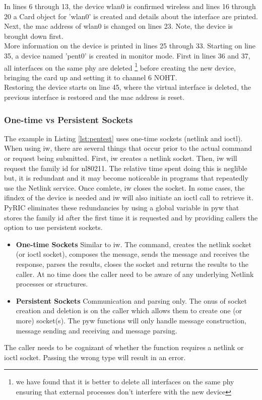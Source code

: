 \documentclass[11pt]{article}
\begin{document}
In lines 6 through 13, the device wlan0 is confirmed wireless and lines 16 through
20 a Card object for 'wlan0' is created and details about the interface are printed. 
Next, the mac address of wlan0 is changed on lines 23. Note, the device is brought
down first. \\

More information on the device is printed in lines 25 through 33. Starting on
line 35, a device named 'pent0' is created in monitor mode. First in lines 36 
and 37, all interfaces on the same phy are deleted \footnote{we have found that
it is better to delete all interfaces on the same phy ensuring that external 
processes don't interfere with the new device} before creating the new device, 
bringing the card up and setting it to channel 6 NOHT.\\ 

Restoring the device starts on line 45, where the virtual interface is deleted,
the previous interface is restored and the mac address is reset.

\subsubsection{One-time vs Persistent Sockets}
The example in Listing \ref{lst:pentest} uses one-time sockets (netlink and 
ioctl). When using iw, there are several things that occur prior to the actual 
command or request being submitted. First, iw creates a netlink socket. Then, 
iw will request the family id for nl80211. The relative time spent doing this 
is neglible but, it is redundant and it may become noticeable in programs that
repeatedly use the Netlink service. Once comlete, iw closes the socket. In some
cases, the ifindex of the device is needed and iw will also initiate an ioctl 
call to retrieve it. PyRIC eliminates these redundancies by using a global 
variable in pyw that stores the family id after the first time it is requested 
and by providing callers the option to use persistent sockets. 
\begin{itemize}
\item \textbf{One-time Sockets} Similar to iw. The command, creates the netlink 
socket (or ioctl socket), composes the message, sends the message and receives 
the response, parses the results, closes the socket and returns the results to 
the caller. At no time does the caller need to be aware of any underlying Netlink 
processes or structures.
\item \textbf{Persistent Sockets} Communication and parsing only. The onus of 
socket creation and deletion is on the caller which allows them to create one 
(or more) socket(s). The pyw functions will only handle message construction, 
message sending and receiving and message parsing.
\end{itemize}
The caller needs to be cognizant of whether the function requires a netlink or
ioctl socket. Passing the wrong type will result in an error. \\
\end{document}
